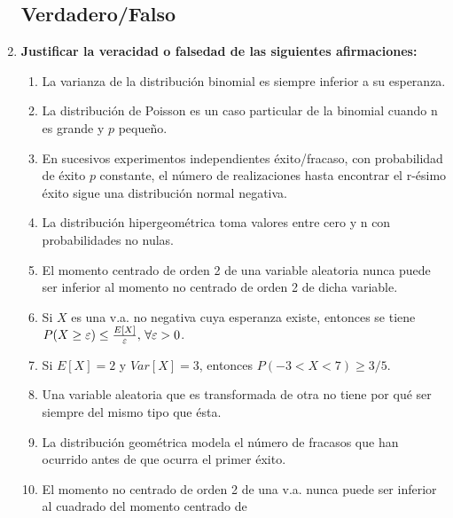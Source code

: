 \documentclass[fleqn]{article}
\begin{document}
\begin{enumerate}
\begin{enumerate}
                        \end{enumerate}


                \newpage

                \subsection{Verdadero/Falso}
                \item \textbf{Justificar la veracidad o falsedad de las siguientes afirmaciones:}

                        \begin{enumerate}
                                \item La varianza de la distribución binomial es siempre inferior a su esperanza.
                                \item La distribución de Poisson es un caso particular de la binomial cuando n es grande y $p$ pequeño.
                                \item En sucesivos experimentos independientes éxito/fracaso, con probabilidad de éxito $p$ constante,
                                        el número de realizaciones hasta encontrar el r-ésimo éxito sigue una distribución normal negativa.
                                \item La distribución hipergeométrica toma valores entre cero y n con probabilidades no nulas.
                                \item El momento centrado de orden 2 de una variable aleatoria nunca puede ser inferior al momento no centrado
                                        de orden 2 de dicha variable.
                                \item Si $X$ es una v.a. no negativa cuya esperanza existe, entonces se tiene
                                        $P(X\geq \varepsilon) \leq \frac{E[X]}{\varepsilon}, \thinspace \forall \varepsilon >0$.
                                \item Si $E[X] = 2$ y $Var[X] = 3$, entonces $P(-3 < X < 7) \geq 3/5$.
                                \item Una variable aleatoria que es transformada de otra no tiene por qué ser siempre del mismo tipo que ésta.
                                \item La distribución geométrica modela el número de fracasos que han ocurrido antes de que ocurra el primer éxito.
                                \item El momento no centrado de orden 2 de una v.a. nunca puede ser inferior al cuadrado del momento centrado de 

\end{enumerate}
\end{enumerate}
\end{document}
